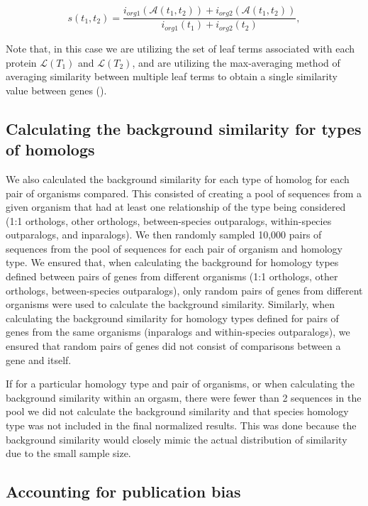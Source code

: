 \begin{equation}
s(t_{1},t_{2})=\frac{ i_{org1}( \mathcal{A}(t_{1},t_{2}) ) + i_{org2}( \mathcal{A}(t_{1},t_{2}) ) }{i_{org1}(t_{1})+i_{org2}(t_{2})},
\end{equation}

Note that, in this case we are utilizing the set of leaf terms associated with each protein $\mathcal{L}(T_{1})$ and $\mathcal{L}(T_{2})$, and are utilizing the max-averaging method of averaging similarity between multiple leaf terms to obtain a single similarity value between genes ().



\subsection{Calculating the background similarity for types of homologs}

We also calculated the background similarity for each type of homolog for each pair of organisms compared.  This consisted of creating a pool of sequences from a given organism that had at least one relationship of the type being considered (1:1 orthologs, other orthologs, between-species outparalogs, within-species outparalogs, and inparalogs). We then randomly sampled 10,000 pairs of sequences from the pool of sequences for each pair of organism and homology type. We ensured that, when calculating the background for homology types defined between pairs of genes from different organisms (1:1 orthologs, other orthologs, between-species outparalogs), only random pairs of genes from different organisms were used to calculate the background similarity.  Similarly, when calculating the background similarity for homology types defined for pairs of genes from the same organisms (inparalogs and within-species outparalogs), we ensured that random pairs of genes did not consist of comparisons between a gene and itself.

If for a particular homology type and pair of organisms, or when calculating the background similarity within an orgasm, there were fewer than 2 sequences in the pool we did not calculate the background similarity and that species homology type was not included in the final normalized results.  This was done because the background similarity would closely mimic the actual distribution of similarity due to the small sample size.

\subsection{Accounting for publication bias}

